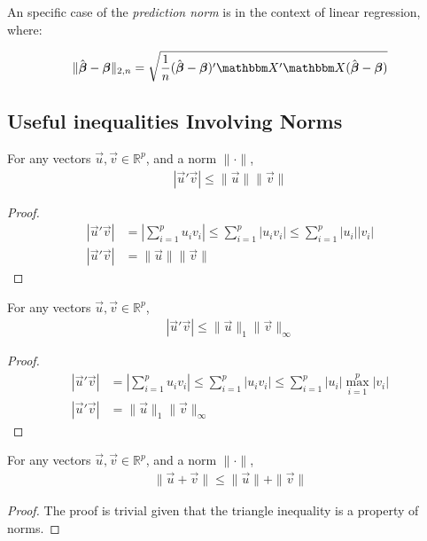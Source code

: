 An specific case of the \emph{prediction norm} is in the context of linear regression, where:

\[
    \|\hat{\Vec{\beta}} - \Vec{\beta}\|_{2, n} 
    = 
    \sqrt{
        \frac{1}{n}
        (\hat{\Vec{\beta}} - \Vec{\beta})'\Mat{X}'\Mat{X}(\hat{\Vec{\beta}} - \Vec{\beta})
    }
\]

\subsection{Useful inequalities Involving Norms}

\begin{theorem}
For any vectors \(\Vec{u}, \Vec{v} \in \mathbb{R}^p\), and a norm \(\|\cdot\|\),
\begin{align*}
    |\Vec{u}'\Vec{v}| \leq \|\Vec{u}\| \|\Vec{v}\|
\end{align*}
\begin{proof}
\begin{align*}
    |\Vec{u}'\Vec{v}| &= \left|\sum_{i=1}^p u_i v_i\right| 
    \leq \sum_{i=1}^p |u_i v_i| 
    \leq \sum_{i=1}^p |u_i| |v_i|\\
    |\Vec{u}'\Vec{v}| &= \|\Vec{u}\| \|\Vec{v}\|
\end{align*}
\end{proof}
\end{theorem}

\begin{theorem}
For any vectors \(\Vec{u}, \Vec{v} \in \mathbb{R}^p\), 
\begin{align*}
    |\Vec{u}'\Vec{v}| \leq \|\Vec{u}\|_1 \|\Vec{v}\|_{\infty}
\end{align*}
    \begin{proof}
    \begin{align*}
        |\Vec{u}'\Vec{v}| &= \left|\sum_{i=1}^p u_i v_i\right| 
        \leq \sum_{i=1}^p |u_i v_i| 
        \leq \sum_{i=1}^p |u_i| \max_{i=1}^p |v_i| \\
        |\Vec{u}'\Vec{v}| &= \|\Vec{u}\|_1 \|\Vec{v}\|_{\infty}
    \end{align*}
    \end{proof}
\end{theorem}

\begin{theorem}
For any vectors \(\Vec{u}, \Vec{v} \in \mathbb{R}^p\), and a norm \(\|\cdot\|\),
\begin{align*}
    \|\Vec{u} + \Vec{v}\| \leq \|\Vec{u}\| + \|\Vec{v}\|
\end{align*}
\begin{proof}
    The proof is trivial given that the triangle inequality is a property of norms.
\end{proof}
\end{theorem}
